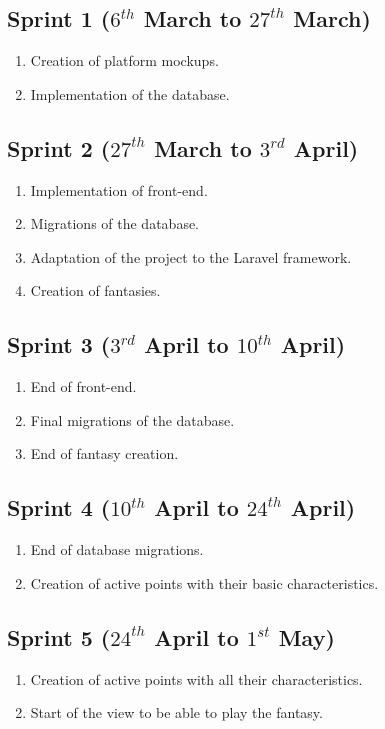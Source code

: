 \subsection{Sprint 1 ($6^{th}$ March to $27^{th}$ March)}
\begin{enumerate}
	\item Creation of platform mockups.
	\item Implementation of the database.
\end{enumerate}

\subsection{Sprint 2 ($27^{th}$ March to $3^{rd}$ April)}
\begin{enumerate}
	\item Implementation of front-end.
	\item Migrations of the database.
	\item Adaptation of the project to the Laravel framework.
	\item Creation of fantasies.
\end{enumerate}

\subsection{Sprint 3 ($3^{rd}$ April to $10^{th}$ April)}
\begin{enumerate}
	\item End of front-end.
	\item Final migrations of the database.
	\item End of fantasy creation.
\end{enumerate}

\subsection{Sprint 4 ($10^{th}$ April to $24^{th}$ April)}
\begin{enumerate}
	\item End of database migrations.
	\item Creation of active points with their basic characteristics.
\end{enumerate}

\subsection{Sprint 5 ($24^{th}$ April to $1^{st}$ May)}
\begin{enumerate}
	\item Creation of active points with all their characteristics.
	\item Start of the view to be able to play the fantasy.
\end{enumerate}

